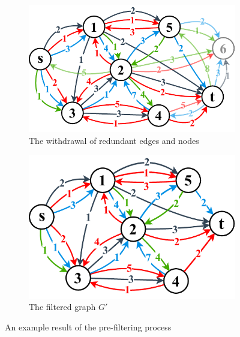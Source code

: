 \setlength{\intextsep}{3pt}
\renewcommand{\scalefigure}{0.7}
\begin{figure}[htbp]
	\centering
	\begin{subfigure}{.49\linewidth}
		\centering
		\includegraphics[scale=\scalefigure]{Figures/chap 3/Filtering Input Graph.pdf}
		\caption{The withdrawal of redundant edges and nodes}
		\label{fig:filteing_graph}
	\end{subfigure}
	\begin{subfigure}{.49\linewidth}
		\centering
		\includegraphics[scale=\scalefigure]{Figures/chap 3/Bold Filtered Graph.pdf}
		\caption{The filtered graph $G'$}
		\label{fig:filtered_graph}
	\end{subfigure}
	\caption{An example result of the pre-filtering process}
	\label{fig:filtering+process}
\end{figure}